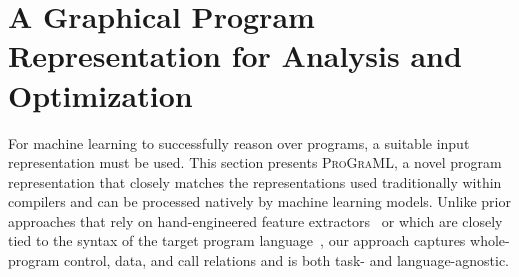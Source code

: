 \section{A Graphical Program Representation for Analysis and Optimization}
\label{sec:graph-representation}

For machine learning to successfully reason over programs, a suitable
input representation must be used. This section presents
\textsc{ProGraML}, a novel program representation that closely matches
the representations used traditionally within compilers and can be
processed natively by machine learning models. Unlike prior approaches
that rely on hand-engineered feature
extractors~\cite{Ashouri2018,Wang2018} or which are closely tied to
the syntax of the target program language~\cite{Allamanis2017b}, our
approach captures whole-program control, data, and call relations and
is both task- and language-agnostic.

